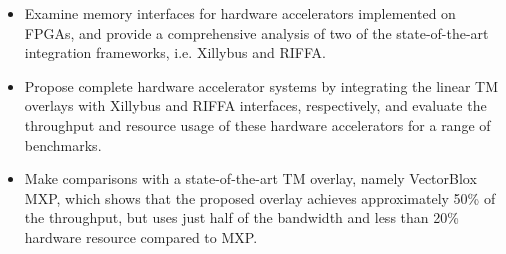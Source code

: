 \begin{itemize}
	\item	
	Examine memory interfaces for hardware accelerators implemented on FPGAs, and provide a comprehensive analysis of two of the state-of-the-art integration frameworks, i.e. Xillybus and RIFFA. 
	
	\item
	Propose complete hardware accelerator systems by integrating the linear TM overlays with Xillybus and RIFFA interfaces, respectively, and evaluate the throughput and resource usage of these hardware accelerators for a range of benchmarks.
	
	\item
	Make comparisons with a state-of-the-art TM overlay, namely VectorBlox MXP, which shows that the proposed overlay achieves approximately 50\% of the throughput, but uses just half of the bandwidth and less than 20\% hardware resource compared to MXP.
	
\end{itemize}
